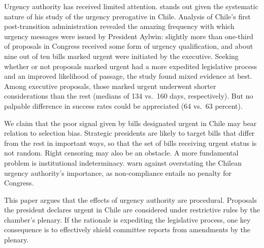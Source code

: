 \documentclass[letter,12pt]{article}
\newcommand{\emm}[1]{\todo[color=red!15, inline]{\textbf{EM:} #1}}
\begin{document}

Urgency authority has received limited attention. \citet{siavelis.2002} stands out given the systematic nature of his study of the urgency prerogative in Chile. Analysis of Chile's first post-transition administration revealed the amazing frequency with which urgency messages were issued by President Aylwin: slightly more than one-third of proposals in Congress received some form of urgency qualification, and about nine out of ten bills marked urgent were initiated by the executive. Seeking whether or not proposals marked urgent had a more expedited legislative process and an improved likelihood of passage, the study found mixed evidence at best. Among executive proposals, those marked urgent underwent shorter considerations than the rest (medians of 134 vs.\ 160 days, respectively). But no palpable difference in success rates could be appreciated (64 vs.\ 63 percent). 

We claim that the poor signal given by bills designated urgent in Chile may bear relation to selection bias. Strategic presidents are likely to target bills that differ from the rest in important ways, so that the set of bills receiving urgent status is not random. Right censoring may also be an obstacle. A more fundamental problem is institutional indeterminacy. \citet{berrios.gamboa.fiscChile.2006} warn against overstating the Chilean urgency authority's importance, as non-compliance entails no penalty for Congress. %

This paper argues that the effects of urgency authority are procedural. Proposals the president declares urgent in Chile are considered under restrictive rules by the chamber's plenary. If the rationale is expediting the legislative process, one key consequence is to effectively shield committee reports from amendments by the plenary.

\end{document}
